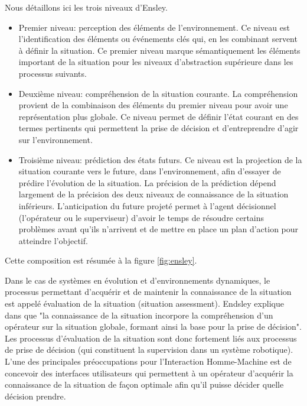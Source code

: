 \documentclass[a4paper,11pt,twoside]{StyleThese}
\begin{document}
Nous détaillons ici les trois niveaux d'Ensley.
\begin{itemize}
\item Premier niveau: perception des éléments de l'environnement. Ce niveau est l'identification des
éléments ou événements clés qui, en les combinant servent à définir la situation.
Ce premier niveau marque sémantiquement les éléments important de la situation pour
les niveaux d'abstraction supérieure dans les processus suivants.
\item Deuxième niveau: compréhension de la situation courante. La compréhension provient de 
la combinaison des éléments du premier niveau pour avoir une représentation plus globale. Ce niveau permet de
définir l'état courant en des termes pertinents qui permettent la prise de 
décision et d'entreprendre d'agir sur l'environnement.
\item Troisième niveau: prédiction des états futurs. Ce niveau est la projection de la situation courante vers le future, dans l'environnement, afin d'essayer de prédire l'évolution de la situation. La précision de la prédiction dépend largement de la précision des deux niveaux de connaissance de la situation inférieurs. L'anticipation du future projeté permet à l'agent décisionnel (l'opérateur ou le superviseur) d'avoir le temps de résoudre certains problèmes avant qu'ils n'arrivent et de mettre en place un plan d'action pour atteindre l'objectif.
\end{itemize}
Cette composition est résumée à la figure \ref{fig:ensley}.

Dans le cas de systèmes en évolution et d'environnements dynamiques, le processus permettant d'acquérir et de maintenir la connaissance de la situation est appelé évaluation de la situation (situation assessment). Endsley explique dans \cite{endsley1995} que "la connaissance de la situation incorpore la compréhension d'un opérateur sur la situation globale, formant ainsi la base pour la prise de décision". Les processus d'évaluation de la situation sont donc fortement liés aux processus de prise de décision (qui constituent la supervision dans un système robotique).
L'une des principales préoccupations pour l'Interaction Homme-Machine est de concevoir des interfaces utilisateurs qui permettent à un opérateur d'acquérir la connaissance de la situation de façon optimale afin qu'il puisse décider quelle décision prendre.
\end{document}
